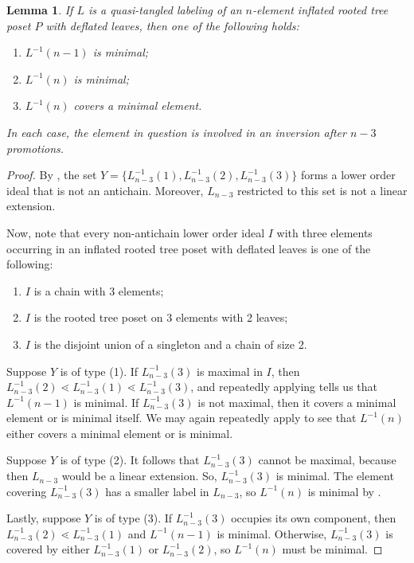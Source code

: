 \documentclass[11pt]{amsart}
\newtheorem{lemma}[thm]{Lemma}
\theoremstyle{definition}
\newcommand{\inverse}{^{-1}}
\begin{document}
\begin{lemma}\label{L^-1(n) position}
	If $ L $ is a quasi-tangled labeling of an $ n $-element inflated rooted tree poset $ P $ with deflated leaves, then one of the following holds:
	\begin{enumerate}
		\item $ L\inverse(n-1) $ is minimal;
		\item $ L\inverse(n) $ is minimal;
		\item $ L\inverse(n) $ covers a minimal element. 
	\end{enumerate} In each case, the element in question is involved in an inversion after $ n-3 $ promotions.
\end{lemma}
\begin{proof}
	By , the set $ Y=\{L_{n-3}\inverse(1),L_{n-3}\inverse(2),L_{n-3}\inverse(3)\} $ forms a lower order ideal that is not an antichain. Moreover, $ L_{n-3} $ restricted to this set is not a linear extension.
	
	Now, note that every non-antichain lower order ideal $ I $ with three elements occurring in an inflated rooted tree poset with deflated leaves is one of the following: \begin{enumerate}
		\item $ I $ is a chain with 3 elements;
		\item $ I $ is the rooted tree poset on 3 elements with 2 leaves;
		\item $ I $ is the disjoint union of a singleton and a chain of size 2.
	\end{enumerate}
	
	Suppose $ Y $ is of type (1). If $ L_{n-3}\inverse(3) $ is maximal in $ I $, then $ L_{n-3}\inverse(2)\lessdot L_{n-3}\inverse(1)\lessdot L_{n-3}\inverse(3) $, and repeatedly applying  tells us that $ L\inverse(n-1) $ is minimal. If $ L_{n-3}\inverse(3) $ is not maximal, then it covers a minimal element or is minimal itself. We may again repeatedly apply  to see that $ L\inverse(n) $ either covers a minimal element or is minimal. 
	
	Suppose $ Y $ is of type (2). It follows that $ L_{n-3}\inverse(3) $ cannot be maximal, because then $ L_{n-3} $ would be a linear extension. So, $ L_{n-3}\inverse(3) $ is minimal. The element covering $ L_{n-3}\inverse(3) $ has a smaller label in $ L_{n-3} $, so $ L\inverse(n) $ is minimal by .
	
	Lastly, suppose $ Y $ is of type (3). If $ L_{n-3}\inverse(3) $ occupies its own component, then $ L_{n-3}\inverse(2)\lessdot L_{n-3}\inverse(1) $ and $ L\inverse(n-1) $ is minimal. Otherwise, $ L_{n-3}\inverse(3) $ is covered by either $ L_{n-3}\inverse(1) $ or $ L_{n-3}\inverse(2) $, so $ L\inverse(n) $ must be minimal. 
\end{proof}
\end{document}
